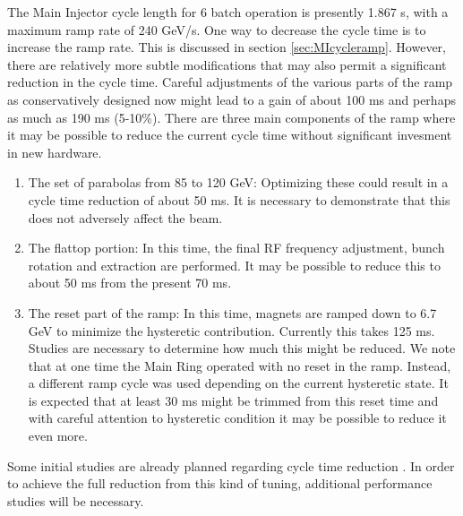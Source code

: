 \documentclass{article}
\begin{document}
\label {sec:MIcycletune}

The Main Injector cycle length for 6 batch operation is presently 1.867 s,
with a maximum ramp rate of 240 GeV/s. One way to decrease the cycle time
is to increase the ramp rate. This is discussed in section 
\ref {sec:MIcycleramp}. However, there are relatively more subtle modifications
that may also permit a significant reduction in the cycle time.
Careful adjustments
of the various parts of the ramp as conservatively designed now might lead
to a gain of about 100 ms and perhaps as much as 190 ms (5-10\%).
There are three main components of the ramp where it may be possible to
reduce the current cycle time without significant invesment in new hardware.
\begin {enumerate}
\item The set of parabolas from 85 to 120 GeV: Optimizing these
could result in a cycle time reduction of about 50 ms. It is necessary to
demonstrate that this does not adversely affect the beam.
\item The flattop portion: In this time, the final RF frequency 
adjustment, bunch rotation and extraction are performed. It may be possible
to reduce this to about 50 ms from the present 70 ms.
\item The reset part of the ramp: In this time, magnets are ramped down to 
6.7 GeV to minimize the hysteretic contribution. Currently this takes 125 ms.
Studies are necessary to determine how much this might be reduced. We note
that at one time the Main Ring operated with no reset in the ramp. Instead,
a different ramp cycle was used depending on the current hysteretic state.
It is expected that at least 30 ms might be trimmed from this reset time and
with careful attention to hysteretic condition it may be possible to reduce
it even more. 
\end {enumerate}
Some initial studies are already planned regarding cycle time reduction \cite
{Capista}. In order to achieve the full reduction from this kind of tuning,
additional performance studies will be necessary.
\end{document}

